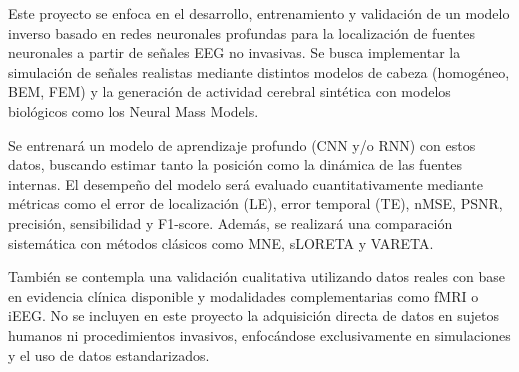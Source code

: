 Este proyecto se enfoca en el desarrollo, entrenamiento y validación de un modelo inverso basado en redes neuronales profundas para la localización de fuentes neuronales a partir de señales EEG no invasivas. Se busca implementar la simulación de señales realistas mediante distintos modelos de cabeza (homogéneo, BEM, FEM) y la generación de actividad cerebral sintética con modelos biológicos como los Neural Mass Models.
    
Se entrenará un modelo de aprendizaje profundo (CNN y/o RNN) con estos datos, buscando estimar tanto la posición como la dinámica de las fuentes internas. El desempeño del modelo será evaluado cuantitativamente mediante métricas como el error de localización (LE), error temporal (TE), nMSE, PSNR, precisión, sensibilidad y F1-score. Además, se realizará una comparación sistemática con métodos clásicos como MNE, sLORETA y VARETA. 
    
También se contempla una validación cualitativa utilizando datos reales con base en evidencia clínica disponible y modalidades complementarias como fMRI o iEEG. No se incluyen en este proyecto la adquisición directa de datos en sujetos humanos ni procedimientos invasivos, enfocándose exclusivamente en simulaciones y el uso de datos estandarizados.
